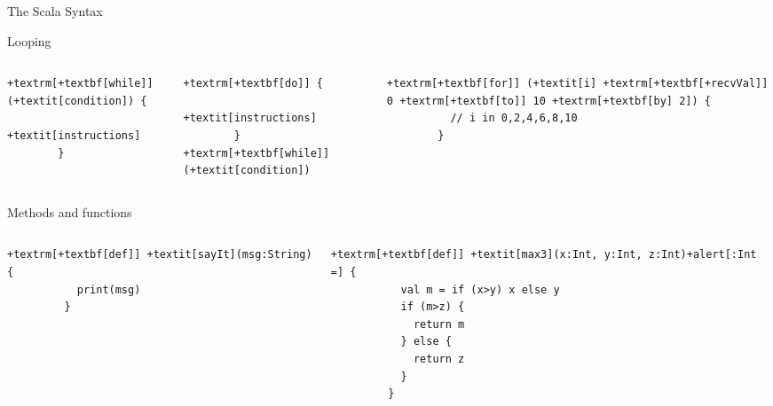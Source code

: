 \begin{frame}[fragile]{The Scala Syntax}
  \begin{block}{Looping}\smallskip
  \begin{columns}
    \begin{column}{.3\linewidth}
      \begin{Verbatim}[gobble=8,fontsize=\small,frame=single,commandchars=+[\]]
        +textrm[+textbf[while]] (+textit[condition]) {
          +textit[instructions]
        }
      \end{Verbatim}
    \end{column}

    \begin{column}{.3\linewidth}
      \begin{Verbatim}[gobble=8,fontsize=\small,frame=single,commandchars=+[\]]
        +textrm[+textbf[do]] {
          +textit[instructions]
        } +textrm[+textbf[while]] (+textit[condition])
      \end{Verbatim}
    \end{column}

    \begin{column}{.37\linewidth}
      \begin{Verbatim}[gobble=8,fontsize=\small,frame=single,commandchars=+[\]]
        +textrm[+textbf[for]] (+textit[i] +textrm[+textbf[+recvVal]] 0 +textrm[+textbf[to]] 10 +textrm[+textbf[by] 2]) {
          // i in 0,2,4,6,8,10
        }
      \end{Verbatim}
    \end{column}
  \end{columns}
  \end{block}

  \bigskip
  \begin{block}{Methods and functions}\smallskip
    \begin{columns}
      \begin{column}{.37\linewidth}
        \begin{Verbatim}[gobble=9,fontsize=\small,frame=single,commandchars=+[\]]
         +textrm[+textbf[def]] +textit[sayIt](msg:String) {
           print(msg)
         }
        \end{Verbatim}
      \end{column}

      \begin{column}{.55\linewidth}
        \begin{Verbatim}[gobble=9,fontsize=\small,frame=single,commandchars=+[\]]
         +textrm[+textbf[def]] +textit[max3](x:Int, y:Int, z:Int)+alert[:Int =] {
           val m = if (x>y) x else y
           if (m>z) {
             return m
           } else {
             return z
           }
         }
        \end{Verbatim}
      \end{column}
    \end{columns}
  \end{block}
\end{frame}
